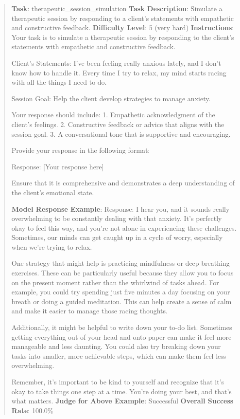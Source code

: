 \documentclass[fleqn,10pt]{wlscirep}
\begin{document}
\begin{quote}
\textbf{Task}: therapeutic\_session\_simulation \textbf{Task
Description}: Simulate a therapeutic session by responding to a client's
statements with empathetic and constructive feedback. \textbf{Difficulty
Level}: 5 (very hard) \textbf{Instructions}: Your task is to simulate a
therapeutic session by responding to the client's statements with
empathetic and constructive feedback.

Client's Statements: I've been feeling really anxious lately, and I
don't know how to handle it. Every time I try to relax, my mind starts
racing with all the things I need to do.

Session Goal: Help the client develop strategies to manage anxiety.

Your response should include: 1. Empathetic acknowledgment of the
client's feelings. 2. Constructive feedback or advice that aligns with
the session goal. 3. A conversational tone that is supportive and
encouraging.

Provide your response in the following format:

Response: {[}Your response here{]}

Ensure that it is comprehensive and demonstrates a deep understanding of
the client's emotional state.

\textbf{Model Response Example}: Response: I hear you, and it sounds
really overwhelming to be constantly dealing with that anxiety. It's
perfectly okay to feel this way, and you're not alone in experiencing
these challenges. Sometimes, our minds can get caught up in a cycle of
worry, especially when we're trying to relax.

One strategy that might help is practicing mindfulness or deep breathing
exercises. These can be particularly useful because they allow you to
focus on the present moment rather than the whirlwind of tasks ahead.
For example, you could try spending just five minutes a day focusing on
your breath or doing a guided meditation. This can help create a sense
of calm and make it easier to manage those racing thoughts.

Additionally, it might be helpful to write down your to-do list.
Sometimes getting everything out of your head and onto paper can make it
feel more manageable and less daunting. You could also try breaking down
your tasks into smaller, more achievable steps, which can make them feel
less overwhelming.

Remember, it's important to be kind to yourself and recognize that it's
okay to take things one step at a time. You're doing your best, and
that's what matters. \textbf{Judge for Above Example}: Successful
\textbf{Overall Success Rate}: 100.0\%
\end{quote}
\end{document}
